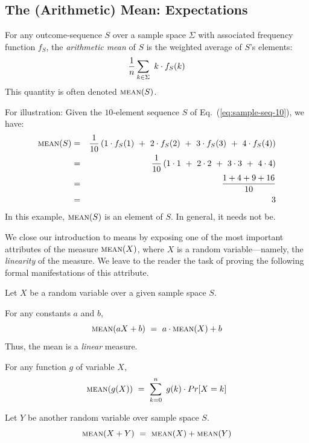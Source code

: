 \subsection{The (Arithmetic) Mean: Expectations}
\label{sec:mean}

   
For any outcome-sequence $S$ over a sample space $\Sigma$ with associated frequency function $f_S$, the {\it arithmetic mean} of $S$ is the weighted average of $S$'s elements:
\[ {1 \over n} \sum_{k \in \Sigma} \ k \cdot f_S(k) \]
This quantity is often denoted $\mbox{\sc mean}(S)$.  

\smallskip

For illustration: Given the $10$-element sequence $S$ of Eq.~(\ref{eq:sample-seq-10}), we have:
\begin{eqnarray*}
\mbox{\sc mean}(S) & = &
{1 \over 10} \left(1 \cdot f_S(1) \ + \ 2 \cdot f_S(2) \ + \ 3 \cdot f_S(3) \ + \ 4 \cdot f_S(4) \right) \\
 & = &
{1 \over 10} \left(1 \cdot 1 \ + \ 2 \cdot 2 \ + \ 3 \cdot 3 \ + \ 4 \cdot 4 \right) \\
 & = &
\frac{1 + 4 + 9 + 16}{10} \\
 & = & 3
\end{eqnarray*}
In this example, $\mbox{\sc mean}(S)$ is an element of $S$.  In general, it needs not be.

\smallskip

We close our introduction to means by exposing one of the most important attributes of the measure $\mbox{\sc mean}(X)$, where $X$ is a random variable---namely, the {\em linearity} of the measure.  We leave to the reader the task of proving the following formal manifestations of this attribute.

\begin{prop} 
\label{thm:mean-linear}
Let $X$ be a random variable over a given sample space $S$.

\smallskip

For any constants $a$ and $b$,
\[ \mbox{\sc mean}(aX+b) \ = \ a \cdot \mbox{\sc mean}(X) + b  \]
Thus, the mean is a {\em linear} measure.

\medskip

For any function $g$ of variable $X$,
\[ \mbox{\sc mean}(g(X)) \ = \ \sum_{k=0}^n \ g(k) \cdot Pr[X = k] \]

\smallskip

Let $Y$ be another random variable over sample space $S$.
\[ \mbox{\sc mean}(X+Y) \ = \  \mbox{\sc mean}(X) + \mbox{\sc mean}(Y) \]
\end{prop}

